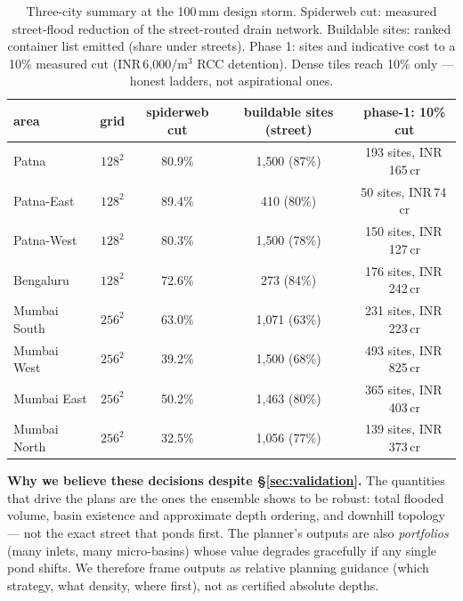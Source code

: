 \documentclass[10pt]{article}
\newcommand{\rupee}{INR\,}   %
\begin{document}
\begin{table}[t]
\centering\small
\caption{Three-city summary at the 100\,mm design storm. Spiderweb cut: measured street-flood
reduction of the street-routed drain network. Buildable sites: ranked container list emitted
(share under streets). Phase 1: sites and indicative cost to a 10\% measured cut
(\rupee6{,}000/m$^3$ RCC detention). Dense tiles reach 10\% only --- honest ladders, not
aspirational ones.}
\label{tab:cities}
\begin{tabular}{lcccc}
\toprule
area & grid & spiderweb cut & buildable sites (street) & phase-1: 10\% cut \\
\midrule
Patna            & $128^2$ & 80.9\% & 1{,}500 (87\%) & 193 sites, \rupee165\,cr \\
Patna-East       & $128^2$ & 89.4\% &   410 (80\%) &  50 sites, \rupee74\,cr \\
Patna-West       & $128^2$ & 80.3\% & 1{,}500 (78\%) & 150 sites, \rupee127\,cr \\
Bengaluru        & $128^2$ & 72.6\% &   273 (84\%) & 176 sites, \rupee242\,cr \\
Mumbai South     & $256^2$ & 63.0\% & 1{,}071 (63\%) & 231 sites, \rupee223\,cr \\
Mumbai West      & $256^2$ & 39.2\% & 1{,}500 (68\%) & 493 sites, \rupee825\,cr \\
Mumbai East      & $256^2$ & 50.2\% & 1{,}463 (80\%) & 365 sites, \rupee403\,cr \\
Mumbai North     & $256^2$ & 32.5\% & 1{,}056 (77\%) & 139 sites, \rupee373\,cr \\
\bottomrule
\end{tabular}
\end{table}

\textbf{Why we believe these decisions despite \S\ref{sec:validation}.} The quantities that drive
the plans are the ones the ensemble shows to be robust: total flooded volume, basin existence and
approximate depth ordering, and downhill topology --- not the exact street that ponds first. The
planner's outputs are also \emph{portfolios} (many inlets, many micro-basins) whose value degrades
gracefully if any single pond shifts. We therefore frame outputs as relative planning guidance
(which strategy, what density, where first), not as certified absolute depths.
\end{document}
